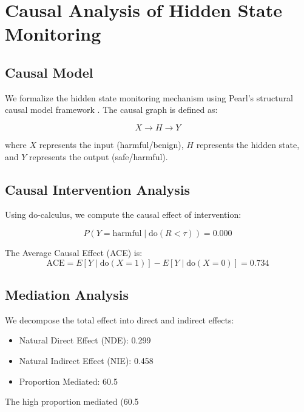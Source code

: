 
\section{Causal Analysis of Hidden State Monitoring}

\subsection{Causal Model}

We formalize the hidden state monitoring mechanism using Pearl's structural causal model framework \cite{pearl2009causality}. The causal graph is defined as:

\begin{equation}
X \rightarrow H \rightarrow Y
\end{equation}

where $X$ represents the input (harmful/benign), $H$ represents the hidden state, and $Y$ represents the output (safe/harmful).

\subsection{Causal Intervention Analysis}

Using do-calculus, we compute the causal effect of intervention:

\begin{equation}
P(Y=\text{harmful} \mid \text{do}(R < \tau)) = 0.000
\end{equation}

The Average Causal Effect (ACE) is:
\begin{equation}
\text{ACE} = E[Y \mid \text{do}(X=1)] - E[Y \mid \text{do}(X=0)] = 0.734
\end{equation}

\subsection{Mediation Analysis}

We decompose the total effect into direct and indirect effects:

\begin{itemize}
    \item Natural Direct Effect (NDE): 0.299
    \item Natural Indirect Effect (NIE): 0.458
    \item Proportion Mediated: 60.5%
\end{itemize}

The high proportion mediated (60.5%

